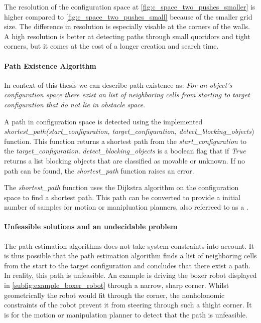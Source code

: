 The resolution of the configuration space at \cref{fig:c_space_two_pushes_smaller} is higher compared to \cref{fig:c_space_two_pushes_small} because of the smaller grid size. The difference in resolution is especially visable at the corners of the walls. A high resolution is better at detecting paths through small quoridors and tight corners, but it comes at the cost of a longer creation and search time.

\paragraph{Path Existence Algorithm}
In context of this thesis we can describe path existence as: \textit{For an object's configuration space there exist an list of neighboring cells from starting to target configuration that do not lie in obstacle space.\bs}

A path in configuration space is detected using the implemented \textit{shortest\_path(start\_configuration, target\_configuration, detect\_blocking\_objects}) function. This function returns a shortest path from the \textit{start\_configuration} to the \textit{target\_configuration}. \textit{detect\_blocking\_objects} is a boolean flag that if \textit{True} returns a list blocking objects that are classified as movable or unknown. If no path can be found, the \textit{shortest\_path} function raises an error.\bs

The \textit{shortest\_path} function uses the Dijkstra algorithm 
\cite{dijkstra_note_1959} on the configuration space to find a shortest path. This path can be converted to provide a initial number of samples for motion or manipluation planners, also referreed to as a .

\paragraph{Unfeasible solutions and an undecidable problem}
The path estimation algorithms does not take system constraints into account. It is thus possible that the path estimation algorithm finds a list of neighboring cells from the start to the target configuration and concludes that there exist a path. In reality, this path is unfeasible. An example is driving the boxer robot displayed in \cref{subfig:example_boxer_robot} through a narrow, sharp corner. Whilst geometrically the robot would fit through the corner, the nonholonomic constraints of the robot prevent it from steering through such a thight corner. It is for the motion or manipulation planner to detect that the path is unfeasible.\\

